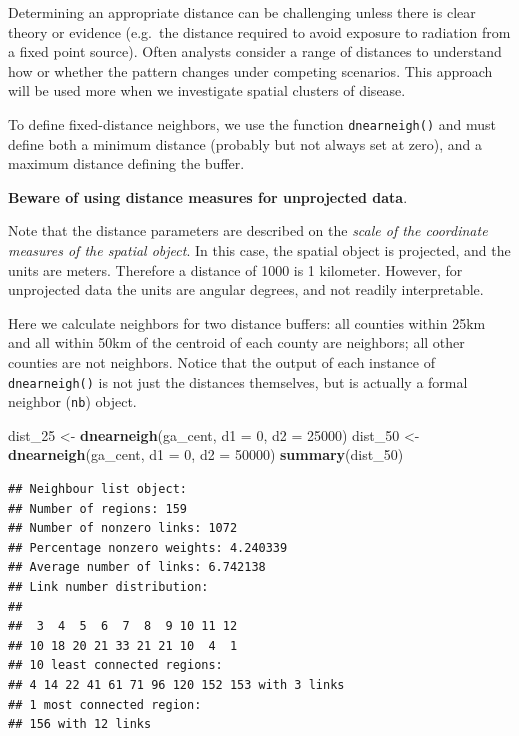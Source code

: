 \documentclass[
]{book}
\newenvironment{Shaded}{\begin{snugshade}}{\end{snugshade}}
\newcommand{\AttributeTok}[1]{\textcolor[rgb]{0.13,0.29,0.53}{#1}}
\newcommand{\DecValTok}[1]{\textcolor[rgb]{0.00,0.00,0.81}{#1}}
\newcommand{\FunctionTok}[1]{\textcolor[rgb]{0.13,0.29,0.53}{\textbf{#1}}}
\newcommand{\NormalTok}[1]{#1}
\newcommand{\OtherTok}[1]{\textcolor[rgb]{0.56,0.35,0.01}{#1}}
\newenvironment{rmdcaution}[1]
  {
  \begin{itemize}
  \renewcommand{\labelitemi}{
    \raisebox{-.7\height}[0pt][0pt]{
      {\setkeys{Gin}{width=3em,keepaspectratio}\texttt{[image: images/\#1]}}
    }
  }
  \setlength{\fboxsep}{1em}
  \begin{caution}
  \item
  }
  {
  \end{caution}
  \end{itemize}
  }
\begin{document}
Determining an appropriate distance can be challenging unless there is clear theory or evidence (e.g.~the distance required to avoid exposure to radiation from a fixed point source). Often analysts consider a range of distances to understand how or whether the pattern changes under competing scenarios. This approach will be used more when we investigate spatial clusters of disease.

To define fixed-distance neighbors, we use the function \texttt{dnearneigh()} and must define both a minimum distance (probably but not always set at zero), and a maximum distance defining the buffer.

\begin{rmdcaution}{caution}
\textbf{Beware of using distance measures for unprojected data}.

Note that the distance parameters are described on the \emph{scale of the coordinate measures of the spatial object}. In this case, the spatial object is projected, and the units are meters. Therefore a distance of 1000 is 1 kilometer. However, for unprojected data the units are angular degrees, and not readily interpretable.

\end{rmdcaution}

Here we calculate neighbors for two distance buffers: all counties within 25km and all within 50km of the centroid of each county are neighbors; all other counties are not neighbors. Notice that the output of each instance of \texttt{dnearneigh()} is not just the distances themselves, but is actually a formal neighbor (\texttt{nb}) object.

\begin{Shaded}
\begin{Highlighting}[]
\NormalTok{dist\_25 }\OtherTok{\textless{}{-}} \FunctionTok{dnearneigh}\NormalTok{(ga\_cent, }\AttributeTok{d1 =} \DecValTok{0}\NormalTok{, }\AttributeTok{d2 =} \DecValTok{25000}\NormalTok{)}
\NormalTok{dist\_50 }\OtherTok{\textless{}{-}} \FunctionTok{dnearneigh}\NormalTok{(ga\_cent, }\AttributeTok{d1 =} \DecValTok{0}\NormalTok{, }\AttributeTok{d2 =} \DecValTok{50000}\NormalTok{)}
\FunctionTok{summary}\NormalTok{(dist\_50)}
\end{Highlighting}
\end{Shaded}

\begin{verbatim}
## Neighbour list object:
## Number of regions: 159 
## Number of nonzero links: 1072 
## Percentage nonzero weights: 4.240339 
## Average number of links: 6.742138 
## Link number distribution:
## 
##  3  4  5  6  7  8  9 10 11 12 
## 10 18 20 21 33 21 21 10  4  1 
## 10 least connected regions:
## 4 14 22 41 61 71 96 120 152 153 with 3 links
## 1 most connected region:
## 156 with 12 links
\end{verbatim}
\end{document}
